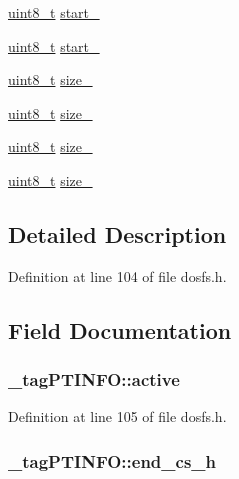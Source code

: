 \begin{DoxyCompactItemize}
\item 
\hyperlink{stdint_8h_aba7bc1797add20fe3efdf37ced1182c5}{uint8\-\_\-t} \hyperlink{struct__tag_p_t_i_n_f_o_af3f9d117e832f3fbefa1e314ca0cf6dc}{start\-\_}
\item 
\hyperlink{stdint_8h_aba7bc1797add20fe3efdf37ced1182c5}{uint8\-\_\-t} \hyperlink{struct__tag_p_t_i_n_f_o_a8e8dc485042d03b9563691c7889dcc35}{start\-\_}
\item 
\hyperlink{stdint_8h_aba7bc1797add20fe3efdf37ced1182c5}{uint8\-\_\-t} \hyperlink{struct__tag_p_t_i_n_f_o_ada4ad45a94528b4871b93db7b4b2869f}{size\-\_}
\item 
\hyperlink{stdint_8h_aba7bc1797add20fe3efdf37ced1182c5}{uint8\-\_\-t} \hyperlink{struct__tag_p_t_i_n_f_o_aac05cc295310da17afb40cb5a0927435}{size\-\_}
\item 
\hyperlink{stdint_8h_aba7bc1797add20fe3efdf37ced1182c5}{uint8\-\_\-t} \hyperlink{struct__tag_p_t_i_n_f_o_a6d85e3e7963f80d263c38da4b8db010f}{size\-\_}
\item 
\hyperlink{stdint_8h_aba7bc1797add20fe3efdf37ced1182c5}{uint8\-\_\-t} \hyperlink{struct__tag_p_t_i_n_f_o_a8fd0e81aab1a0c09454be84655aabab7}{size\-\_}
\end{DoxyCompactItemize}


\subsection{Detailed Description}


Definition at line 104 of file dosfs.\-h.



\subsection{Field Documentation}
\hypertarget{struct__tag_p_t_i_n_f_o_aeec71d70adc7b2712171a2d240660645}{
\subsubsection[{active}]{ \-\_\-tag\-P\-T\-I\-N\-F\-O\-::active}}\label{struct__tag_p_t_i_n_f_o_aeec71d70adc7b2712171a2d240660645}


Definition at line 105 of file dosfs.\-h.

\hypertarget{struct__tag_p_t_i_n_f_o_a1eeadf0b960061519a8e04e0bcf6e7e3}{
\subsubsection[{end\-\_\-cs\-\_\-h}]{ \-\_\-tag\-P\-T\-I\-N\-F\-O\-::end\-\_\-cs\-\_\-h}}\label{struct__tag_p_t_i_n_f_o_a1eeadf0b960061519a8e04e0bcf6e7e3}


